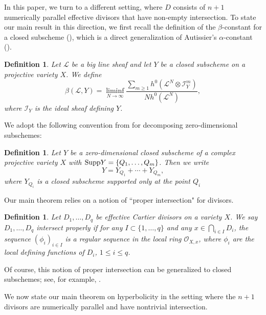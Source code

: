 \documentclass[10pt]{amsart}
\numberwithin{equation}{section}
\theoremstyle{plain}
\newtheorem{definition}[theorem]{Definition}
\theoremstyle{definition}
\begin{document}
 
 In this paper, we turn to a different setting, where $D$  consists of $n+1$ numerically parallel effective divisors that  have non-empty intersection.  
To state our main result in this direction, we first recall the definition of the $\beta$-constant for a closed subscheme (\cite[Definition 1.2]{RW22}), which is a direct generalization of Autissier's $\alpha$-constant (\cite[Definition 2.4]{Aut11}).
\begin{definition}\label{def_beta}
Let $\mathscr L$ be a big line sheaf and let $Y$ be a closed subscheme
 on a projective variety $X$.  We define
\begin{equation*}
  \beta(\mathscr L, Y)
    = \liminf_{N\to\infty}
      \frac {\sum_{m\ge 1}h^0(\mathscr L^N\otimes {\mathscr I}_{Y}^{m})} {Nh^0(\mathscr L^N)},
\end{equation*}
where ${\mathscr I}_{Y}$ is the ideal sheaf defining $Y$. 
\end{definition}

We adopt the following convention from \cite{HLX} for decomposing zero-dimensional subschemes:
\begin{definition}\label{local_beta}
Let  $Y$ be a zero-dimensional closed subscheme
 of a complex projective variety $X$ with ${\rm Supp} Y=\{Q_1,\hdots,Q_m\}$.  Then we write 
 $$
 Y=Y_{Q_1}+\cdots+Y_{Q_m},
 $$  
 where $Y_{Q_i}$ is a closed subscheme supported only at the point $Q_i$
 \end{definition}

Our main theorem relies on a notion of ``proper intersection" for divisors.
\begin{definition}
    Let $D_1,\ldots,D_q$ be effective Cartier divisors on a variety $X$. We say $D_1,\ldots,D_q$ intersect properly if for any $I \subset \{1,\ldots,q\}$ and any $x \in \bigcap_{i \in I}  D_i$, the sequence $(\phi_i)_{i \in I}$ is a regular sequence in the local ring $\mathcal{O}_{X,x}$, where $\phi_i$ are the local defining functions of $D_i$, $1 \leq i \leq q$.
\end{definition}
Of course, this notion of proper intersection can be generalized to closed subschemes; see, for example, \cite{Voj23}.

We now state our main theorem on hyperbolicity in the setting where the $n+1$ divisors are numerically parallel and have nontrivial intersection.
\end{document}
